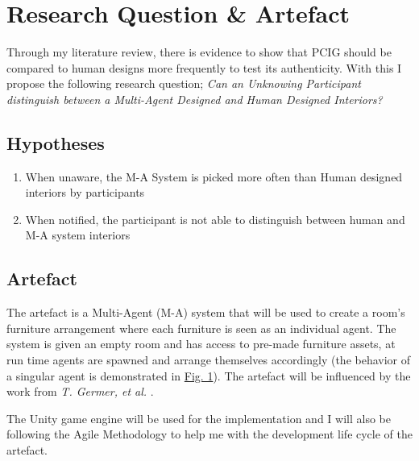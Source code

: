 \section{Research Question \& Artefact}

Through my literature review, there is evidence to show that PCIG should be compared to human designs more frequently to test its authenticity. With this I propose the following research question; \textit{Can an Unknowing Participant distinguish between a Multi-Agent Designed and Human Designed Interiors?}

\subsection{Hypotheses}
\begin{enumerate}
    \item When unaware, the M-A System is picked more often than Human designed interiors by participants
    \item When notified, the participant is not able to distinguish between human and M-A system interiors
\end{enumerate}

\subsection{Artefact}

The artefact is a Multi-Agent (M-A) system that will be used to create a room's furniture arrangement where each furniture is seen as an individual agent. The system is given an empty room and has access to pre-made furniture assets, at run time agents are spawned and arrange themselves accordingly (the behavior of a singular agent is demonstrated in \hyperref[activity-diagram]{Fig. 1}). The artefact will be influenced by the work from \textit{T. Germer, et al.} \cite{real-time-walkthroughs}.

The Unity game engine will be used for the implementation \cite{unity} and I will also be following the Agile Methodology \cite{agile} to help me with the development life cycle of the artefact.
